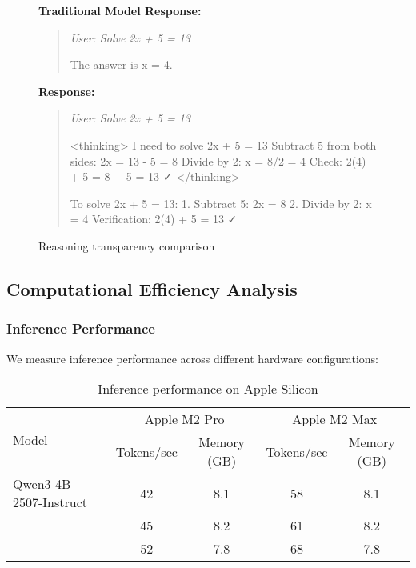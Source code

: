 \begin{table}[H]
\begin{table}[H]
\begin{figure}[H]
\begin{minipage}{0.48\textwidth}
\textbf{Traditional Model Response:}
\begin{quote}
\footnotesize
\textit{User: Solve 2x + 5 = 13}

The answer is x = 4.
\end{quote}
\end{minipage}
\hfill
\begin{minipage}{0.48\textwidth}
\textbf{\supra{} Response:}
\begin{quote}
\footnotesize
\textit{User: Solve 2x + 5 = 13}

<thinking>
I need to solve 2x + 5 = 13
Subtract 5 from both sides:
2x = 13 - 5 = 8
Divide by 2:
x = 8/2 = 4
Check: 2(4) + 5 = 8 + 5 = 13 ✓
</thinking>

To solve 2x + 5 = 13:
1. Subtract 5: 2x = 8
2. Divide by 2: x = 4
Verification: 2(4) + 5 = 13 ✓
\end{quote}
\end{minipage}
\caption{Reasoning transparency comparison}
\label{fig:reasoning-example}
\end{figure}

\subsection{Computational Efficiency Analysis}

\subsubsection{Inference Performance}

We measure inference performance across different hardware configurations:

\begin{table}[H]
\centering
\begin{tabular}{lcccc}
\toprule
\multirow{2}{*}{Model} & \multicolumn{2}{c}{Apple M2 Pro} & \multicolumn{2}{c}{Apple M2 Max} \\
\cmidrule(lr){2-3} \cmidrule(lr){4-5}
& Tokens/sec & Memory (GB) & Tokens/sec & Memory (GB) \\
\midrule
Qwen3-4B-2507-Instruct & 42 & 8.1 & 58 & 8.1 \\
\textbf{\supra{}} & 45 & 8.2 & 61 & 8.2 \\
\textbf{\zennano{}} & 52 & 7.8 & 68 & 7.8 \\
\bottomrule
\end{tabular}
\caption{Inference performance on Apple Silicon}
\label{tab:inference-performance}
\end{table}


\end{table}
\end{table}
